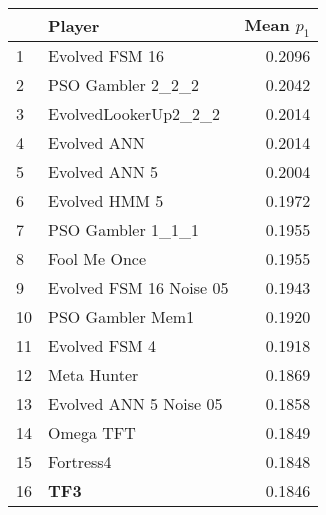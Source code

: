 \begin{tabular}{llr}
\toprule
{} &                   Player &  Mean $p_1$ \\
\midrule
1  &           Evolved FSM 16 &      0.2096 \\
2  &        PSO Gambler 2\_2\_2 &      0.2042 \\
3  &     EvolvedLookerUp2\_2\_2 &      0.2014 \\
4  &              Evolved ANN &      0.2014 \\
5  &            Evolved ANN 5 &      0.2004 \\
6  &            Evolved HMM 5 &      0.1972 \\
7  &        PSO Gambler 1\_1\_1 &      0.1955 \\
8  &             Fool Me Once &      0.1955 \\
9  &  Evolved FSM 16 Noise 05 &      0.1943 \\
10 &         PSO Gambler Mem1 &      0.1920 \\
11 &            Evolved FSM 4 &      0.1918 \\
12 &              Meta Hunter &      0.1869 \\
13 &   Evolved ANN 5 Noise 05 &      0.1858 \\
14 &                Omega TFT &      0.1849 \\
15 &                Fortress4 &      0.1848 \\
16 &                      \textbf{TF3} &      0.1846 \\
\bottomrule
\end{tabular}
